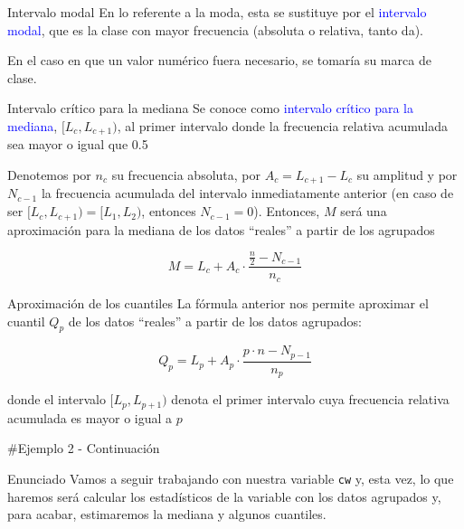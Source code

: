 \documentclass[
  ignorenonframetext,
  aspectratio=169]{beamer}
\newcommand\blue[1]{\textcolor{blue}{#1}}
\begin{document}
\begin{frame}{Intervalo modal}
\protect\hypertarget{intervalo-modal}{}
En lo referente a la moda, esta se sustituye por el
\blue{intervalo modal}, que es la clase con mayor frecuencia (absoluta o
relativa, tanto da).

En el caso en que un valor numérico fuera necesario, se tomaría su marca
de clase.
\end{frame}

\begin{frame}{Intervalo crítico para la mediana}
\protect\hypertarget{intervalo-cruxedtico-para-la-mediana}{}
Se conoce como \blue{intervalo crítico para la mediana},
\([L_c,L_{c+1})\), al primer intervalo donde la frecuencia relativa
acumulada sea mayor o igual que 0.5

Denotemos por \(n_c\) su frecuencia absoluta, por \(A_c = L_{c+1}-L_c\)
su amplitud y por \(N_{c-1}\) la frecuencia acumulada del intervalo
inmediatamente anterior (en caso de ser \([L_c,L_{c+1})=[L_1,L_2)\),
entonces \(N_{c-1}=0\)). Entonces, \(M\) será una aproximación para la
mediana de los datos ``reales'' a partir de los agrupados

\[M = L_c +A_c\cdot\frac{\frac{n}{2}-N_{c-1}}{n_c}\]
\end{frame}

\begin{frame}{Aproximación de los cuantiles}
\protect\hypertarget{aproximaciuxf3n-de-los-cuantiles}{}
La fórmula anterior nos permite aproximar el cuantil \(Q_p\) de los
datos ``reales'' a partir de los datos agrupados:

\[Q_p = L_p +A_p\cdot\frac{p\cdot n-N_{p-1}}{n_p}\]

donde el intervalo \([L_p,L_{p+1})\) denota el primer intervalo cuya
frecuencia relativa acumulada es mayor o igual a \(p\)

\#Ejemplo 2 - Continuación
\end{frame}

\begin{frame}[fragile]{Enunciado}
\protect\hypertarget{enunciado-2}{}
Vamos a seguir trabajando con nuestra variable \texttt{cw} y, esta vez,
lo que haremos será calcular los estadísticos de la variable con los
datos agrupados y, para acabar, estimaremos la mediana y algunos
cuantiles.
\end{frame}
\end{document}
